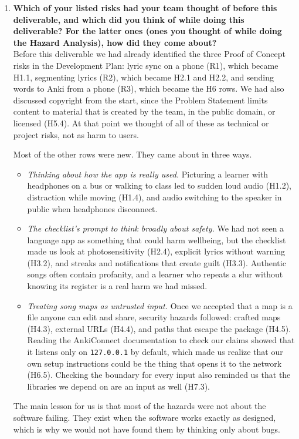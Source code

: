 \documentclass{article}
\begin{document}
\begin{enumerate}
    \item \textbf{Which of your listed risks had your team thought of before
    this deliverable, and which did you think of while doing this
    deliverable? For the latter ones (ones you thought of while doing the
    Hazard Analysis), how did they come about?}\\
    Before this deliverable we had already identified the three Proof of
    Concept risks in the Development Plan: lyric sync on a phone (R1), which
    became H1.1, segmenting lyrics (R2), which became H2.1 and H2.2, and
    sending words to Anki from a phone (R3), which became the H6 rows. We had
    also discussed copyright from the start, since the Problem Statement
    limits content to material that is created by the team, in the public
    domain, or licensed (H5.4). At that point we thought of all of these as
    technical or project risks, not as harm to users.

    Most of the other rows were new. They came about in three ways.
    \begin{itemize}
      \item \emph{Thinking about how the app is really used.} Picturing a
            learner with headphones on a bus or walking to class led to
            sudden loud audio (H1.2), distraction while moving (H1.4), and
            audio switching to the speaker in public when headphones
            disconnect.
      \item \emph{The checklist's prompt to think broadly about safety.} We
            had not seen a language app as something that could harm
            wellbeing, but the checklist made us look at photosensitivity
            (H2.4), explicit lyrics without warning (H3.2), and streaks and
            notifications that create guilt (H3.3). Authentic songs often
            contain profanity, and a learner who repeats a slur without
            knowing its register is a real harm we had missed.
      \item \emph{Treating song maps as untrusted input.} Once we accepted that
            a map is a file anyone can edit and share, security hazards
            followed: crafted maps (H4.3), external URLs (H4.4), and paths
            that escape the package (H4.5). Reading the AnkiConnect
            documentation to check our claims showed that it listens only
            on \texttt{127.0.0.1} by default, which made us realize that our
            own setup instructions could be the thing that opens it to the
            network (H6.5). Checking the boundary for every input also
            reminded us that the libraries we depend on are an input as well
            (H7.3).
    \end{itemize}
    The main lesson for us is that most of the hazards were not about the
    software failing. They exist when the software works exactly as
    designed, which is why we would not have found them by thinking only
    about bugs.


\end{enumerate}
\end{document}
